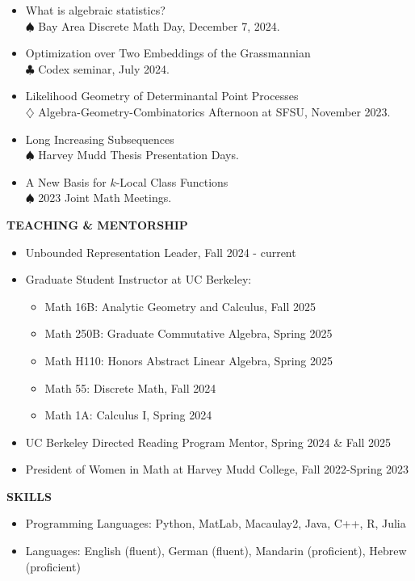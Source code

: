 \documentclass[11pt]{article}
\newcommand{\hdr}[1]{\textcolor{blue(ryb)}{\textbf{#1}}}
\begin{document}
\begin{itemize}
\item What is algebraic statistics?\\
  $\spadesuit$ Bay Area Discrete Math Day, December 7, 2024. 
\item Optimization over Two Embeddings of the Grassmannian\\
  $\clubsuit$ Codex seminar, July 2024. 
\item Likelihood Geometry of Determinantal Point Processes\\
  $\diamondsuit$ Algebra-Geometry-Combinatorics Afternoon at SFSU, November 2023.
\item Long Increasing Subsequences\\
  $\spadesuit$ Harvey Mudd Thesis Presentation Days.
\item A New Basis for $k$-Local Class Functions\\
  $\spadesuit$ 2023 Joint Math Meetings.
\end{itemize}

\bigskip


\hdr{TEACHING \& MENTORSHIP}\\
\begin{itemize}
\item Unbounded Representation Leader, Fall 2024 - current
\item Graduate Student Instructor at UC Berkeley:
  \begin{itemize}
  \item Math 16B: Analytic Geometry and Calculus, Fall 2025
  \item Math 250B: Graduate Commutative Algebra, Spring 2025
  \item Math H110: Honors Abstract Linear Algebra, Spring 2025
  \item Math 55: Discrete Math, Fall 2024
  \item Math 1A: Calculus I, Spring 2024
  \end{itemize}
\item UC Berkeley Directed Reading Program Mentor, Spring 2024 \& Fall 2025
\item President of Women in Math at Harvey Mudd College, Fall 2022-Spring 2023
\end{itemize}

\bigskip

\hdr{SKILLS}\\
\begin{itemize}
\item 
Programming Languages: Python, MatLab, Macaulay2, Java, C++, R, Julia\\
\item 
Languages: English (fluent), German (fluent), Mandarin (proficient), Hebrew (proficient)
\end{itemize}
\end{document}
